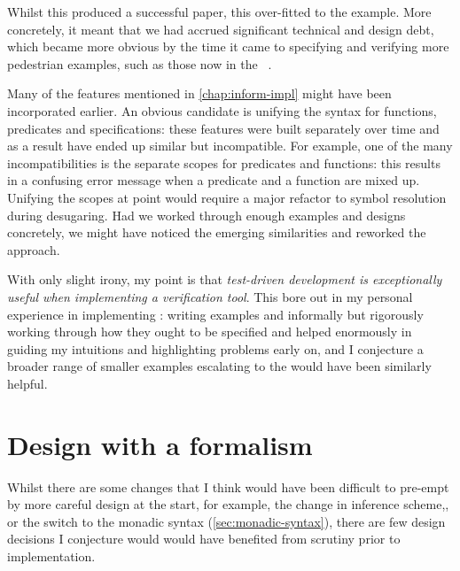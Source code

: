 Whilst this produced a successful paper, this over-fitted  to the example.
More concretely, it meant that we had accrued significant technical and design
debt, which became more obvious by the time it came to specifying and verifying
more pedestrian examples, such as those now in the ~\cite{pulte2024tutorial}.

Many of the features mentioned in \cref{chap:inform-impl} might have been
incorporated earlier. An obvious candidate is unifying the syntax for
functions, predicates and specifications: these features were built separately
over time and as a result have ended up similar but
incompatible. For example, one of the many incompatibilities is the separate scopes
for predicates and functions: this results in a confusing error message when
a predicate and a function are mixed up. Unifying the scopes at
point would require a major refactor to symbol resolution during
desugaring. Had we worked through enough examples and designs concretely, we might
have noticed the emerging similarities and reworked the approach.

With only slight irony, my point is that \emph{test-driven development is
exceptionally useful when implementing a verification tool}. This bore out in
my personal experience in implementing : writing examples and
informally but rigorously working through how they ought to be specified and
helped enormously in guiding my intuitions and highlighting problems early on,
and I conjecture a broader range of smaller examples escalating to the
 would have been similarly helpful.

\section{Design with a formalism}

Whilst there are some changes that I think would have been difficult to
pre-empt by more careful design at the start, for example, the change in
inference
scheme,, or the switch to the monadic syntax
(\cref{sec:monadic-syntax}), there are few design decisions I conjecture would
would have benefited from scrutiny prior to implementation.

